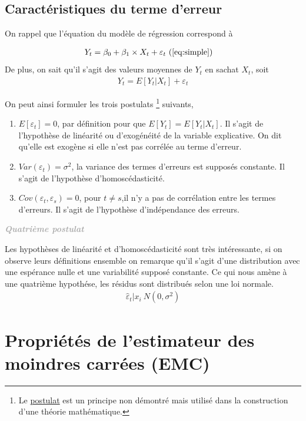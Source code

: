\documentclass[11pt,french]{report}
\newenvironment{moreInfo}[1]
	{\begin{mdframed}
	\textcolor{darkgray}{\huge \raisebox{-3.5pt}{\faInfo} 
	\hspace{0.5cm} \large\bfseries #1}\\[5pt]
	\normalsize
	\makebox[0.1\textwidth][l]{}	
	\begin{minipage}{10cm}}
	{	\end{minipage}
	\end{mdframed}}
\begin{document}
\subsection{Caractéristiques du terme d'erreur}
On rappel que l'équation du modèle de régression correspond à 

\begin{align*}
Y_t &= \beta_0 + \beta_1\times X_t + \varepsilon_t \text{ (\ref{eq:simple})}
\end{align*}
De plus, on sait qu'il s'agit des valeurs moyennes de $Y_t$ en sachat $X_t$, soit
\begin{align*}
Y_t = E[Y_t|X_t] + \varepsilon_t 
\end{align*}

On peut ainsi formuler les trois postulats \footnote{Le \href{https://fr.wikipedia.org/wiki/Postulat}{postulat} est un principe non démontré mais utilisé dans la construction d'une théorie mathématique. } suivants,
\begin{enumerate}
\item \label{post1} $E[\varepsilon_t] = 0$, par définition pour que $E[Y_t] = E[Y_t|X_t]$. Il s'agit de l'hypothèse de linéarité ou d'exogénéité de la variable explicative. On dit qu'elle est exogène si elle n'est pas corrélée au terme d'erreur.
\item \label{post2} $Var(\varepsilon_t) = \sigma^2$, la variance des termes d'erreurs est supposés constante. Il s'agit de l'hypothèse d'homoscédasticité.
\item \label{post3} $Cov(\varepsilon_t, \varepsilon_s) = 0$, pour $t \neq s$,il n'y a pas de corrélation entre les termes d'erreurs. Il s'agit de l'hypothèse d'indépendance des erreurs.
\end{enumerate}

\bigskip
\begin{moreInfo}{\emph{Quatrième postulat}}
\label{post4}
	Les hypothèses de linéarité et d'homoscédasticité sont très intéressante, si on observe leurs définitions ensemble on remarque qu'il s'agit d'une distribution avec une espérance nulle et une variabilité supposé constante. Ce qui nous amène à une quatrième hypothése, les résidus sont distribués selon une loi normale.
	\begin{align*}
\hat{\varepsilon}_t|x_i ~ N(0, \sigma^2)
	\end{align*}
\end{moreInfo}
\bigskip

\section{Propriétés de l'estimateur des moindres carrées (EMC)}
\end{document}
